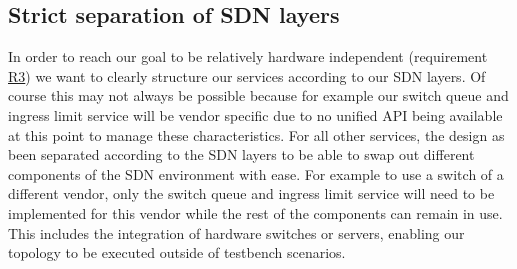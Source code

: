 \subsection{Strict separation of SDN layers}
In order to reach our goal to be relatively hardware independent (requirement \hyperref[R3]{R3}) we want to clearly structure our services according to our SDN layers. Of course this may not always be possible because for example our switch queue and ingress limit service will be vendor specific due to no unified API being available at this point to manage these characteristics. For all other services, the design as been separated according to the SDN layers to be able to swap out different components of the SDN environment with ease. For example to use a switch of a different vendor, only the switch queue and ingress limit service will need to be implemented for this vendor while the rest of the components can remain in use. This includes the integration of hardware switches or servers, enabling our topology to be executed outside of testbench scenarios.